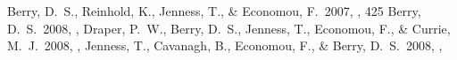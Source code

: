 \documentclass[11pt,twoside]{article}  %
\begin{document}
%
\begin{references}
 Berry, D.~S., Reinhold, K., Jenness, T., \& Economou, F.\ 2007, \adassxvi, 425
 Berry, D.~S.\ 2008, \adassxvii, 
 Draper, P.~W., Berry, D.~S., Jenness, T., Economou, F., \& Currie, M.~J.\ 2008, \adassxvii, 
 Jenness, T., Cavanagh, B., Economou, F., \& Berry, D.~S.\ 2008, \adassxvii, 
\end{references}

\end{document}
